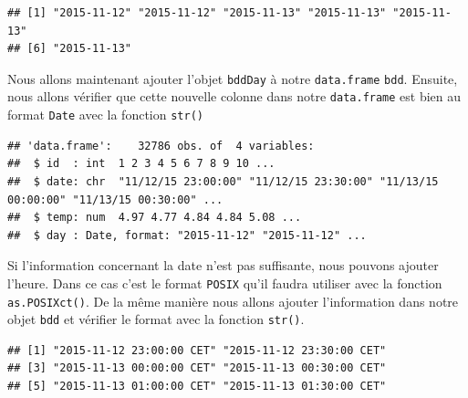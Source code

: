\documentclass[
]{book}
\newenvironment{Shaded}{\begin{snugshade}}{\end{snugshade}}
\newcommand{\DataTypeTok}[1]{\textcolor[rgb]{0.13,0.29,0.53}{#1}}
\newcommand{\KeywordTok}[1]{\textcolor[rgb]{0.13,0.29,0.53}{\textbf{#1}}}
\newcommand{\NormalTok}[1]{#1}
\newcommand{\OperatorTok}[1]{\textcolor[rgb]{0.81,0.36,0.00}{\textbf{#1}}}
\newcommand{\StringTok}[1]{\textcolor[rgb]{0.31,0.60,0.02}{#1}}
\begin{document}
\begin{verbatim}
## [1] "2015-11-12" "2015-11-12" "2015-11-13" "2015-11-13" "2015-11-13"
## [6] "2015-11-13"
\end{verbatim}

Nous allons maintenant ajouter l'objet \texttt{bddDay} à notre \texttt{data.frame} \texttt{bdd}. Ensuite, nous allons vérifier que cette nouvelle colonne dans notre \texttt{data.frame} est bien au format \texttt{Date} avec la fonction \texttt{str()}

\begin{Shaded}
\end{Shaded}

\begin{verbatim}
## 'data.frame':    32786 obs. of  4 variables:
##  $ id  : int  1 2 3 4 5 6 7 8 9 10 ...
##  $ date: chr  "11/12/15 23:00:00" "11/12/15 23:30:00" "11/13/15 00:00:00" "11/13/15 00:30:00" ...
##  $ temp: num  4.97 4.77 4.84 4.84 5.08 ...
##  $ day : Date, format: "2015-11-12" "2015-11-12" ...
\end{verbatim}

Si l'information concernant la date n'est pas suffisante, nous pouvons ajouter l'heure. Dans ce cas c'est le format \texttt{POSIX} qu'il faudra utiliser avec la fonction \texttt{as.POSIXct()}. De la même manière nous allons ajouter l'information dans notre objet \texttt{bdd} et vérifier le format avec la fonction \texttt{str()}.

\begin{Shaded}
\end{Shaded}

\begin{verbatim}
## [1] "2015-11-12 23:00:00 CET" "2015-11-12 23:30:00 CET"
## [3] "2015-11-13 00:00:00 CET" "2015-11-13 00:30:00 CET"
## [5] "2015-11-13 01:00:00 CET" "2015-11-13 01:30:00 CET"
\end{verbatim}

\begin{Shaded}
\end{Shaded}
\end{document}
